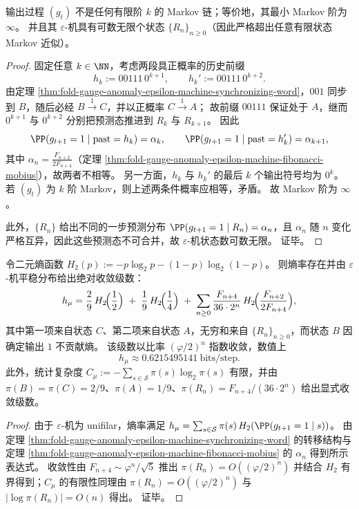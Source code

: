 \begin{theorem}\label{thm:fold-gauge-anomaly-epsilon-machine-infinite-markov-order}
输出过程 \((g_t)\) 不是任何有限阶 \(k\) 的 Markov 链；等价地，其最小 Markov 阶为 \(\infty\)。
并且其 \(\varepsilon\)-机具有可数无限个状态 \(\{R_n\}_{n\ge0}\)（因此严格超出任意有限状态 Markov 近似）。
\end{theorem}
\begin{proof}
固定任意 \(k\in\NN\)，考虑两段具正概率的历史前缀
\[
h_k:=00111\,0^{k+1},\qquad h_k':=00111\,0^{k+2}.
\]
由定理 \ref{thm:fold-gauge-anomaly-epsilon-machine-synchronizing-word}，\(001\) 同步到 \(B\)，随后必经 \(B\xrightarrow{1}C\)，并以正概率 \(C\xrightarrow{1}A\)；
故前缀 \(00111\) 保证处于 \(A\)，继而 \(0^{k+1}\) 与 \(0^{k+2}\) 分别把预测态推进到 \(R_k\) 与 \(R_{k+1}\)。
因此
\[
\PP(g_{t+1}=1\mid \mathrm{past}=h_k)=\alpha_k,\qquad
\PP(g_{t+1}=1\mid \mathrm{past}=h_k')=\alpha_{k+1},
\]
其中 \(\alpha_n=\frac{F_{n+2}}{2F_{n+4}}\)（定理 \ref{thm:fold-gauge-anomaly-epsilon-machine-fibonacci-mobius}），故两者不相等。
另一方面，\(h_k\) 与 \(h_k'\) 的最后 \(k\) 个输出符号均为 \(0^k\)。
若 \((g_t)\) 为 \(k\) 阶 Markov，则上述两条件概率应相等，矛盾。
故 Markov 阶为 \(\infty\)。
\par
此外，\(\{R_n\}\) 给出不同的一步预测分布 \(\PP(g_{t+1}=1\mid R_n)=\alpha_n\)，且 \(\alpha_n\) 随 \(n\) 变化严格互异，因此这些预测态不可合并，故 \(\varepsilon\)-机状态数可数无限。
证毕。
\end{proof}

\begin{proposition}[熵率与统计复杂度的显式级数]\label{prop:fold-gauge-anomaly-epsilon-machine-entropy-rate-complexity}
令二元熵函数 \(H_2(p):=-p\log_2 p-(1-p)\log_2(1-p)\)。
则熵率存在并由 \(\varepsilon\)-机平稳分布给出绝对收敛级数：
\[
h_\mu
=\frac{2}{9}\,H_2\!\Bigl(\frac12\Bigr)
\;+\;\frac{1}{9}\,H_2\!\Bigl(\frac14\Bigr)
\;+\;\sum_{n\ge0}\frac{F_{n+4}}{36\cdot 2^n}\,
H_2\!\Bigl(\frac{F_{n+2}}{2F_{n+4}}\Bigr),
\]
其中第一项来自状态 \(C\)、第二项来自状态 \(A\)，无穷和来自 \(\{R_n\}_{n\ge0}\)，而状态 \(B\) 因确定输出 \(1\) 不贡献熵。
该级数以比率 \((\varphi/2)^n\) 指数收敛，数值上
\[
h_\mu\approx 0.6215495141\ \text{bits/step}.
\]
此外，统计复杂度
\(
C_\mu:=-\sum_{s\in\mathcal S}\pi(s)\log_2\pi(s)
\)
有限，并由 \(\pi(B)=\pi(C)=2/9\)、\(\pi(A)=1/9\)、\(\pi(R_n)=F_{n+4}/(36\cdot2^n)\) 给出显式收敛级数。
\end{proposition}
\begin{proof}
由于 \(\varepsilon\)-机为 unifilar，熵率满足
\(
h_\mu=\sum_{s\in\mathcal S}\pi(s)\,H_2(\PP(g_{t+1}=1\mid s))
\)。
由定理 \ref{thm:fold-gauge-anomaly-epsilon-machine-synchronizing-word} 的转移结构与定理 \ref{thm:fold-gauge-anomaly-epsilon-machine-fibonacci-mobius} 的 \(\alpha_n\) 得到所示表达式。
收敛性由 \(F_{n+4}\sim \varphi^n/\sqrt5\) 推出 \(\pi(R_n)=O((\varphi/2)^n)\) 并结合 \(H_2\) 有界得到；\(C_\mu\) 的有限性同理由 \(\pi(R_n)=O((\varphi/2)^n)\) 与 \(|\log\pi(R_n)|=O(n)\) 得出。
证毕。
\end{proof}


